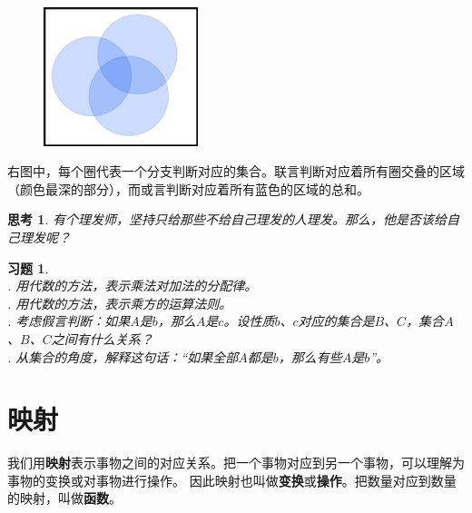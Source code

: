\documentclass[12pt,UTF8]{ctexbook}
\theoremstyle{definition}
\theoremstyle{plain}
\newtheorem{sk}{思考}[section]
\newtheorem{xt}{习题}[section]
\begin{document}
\begin{figure} %
    \vspace{-28pt}
    \flushright
    \includegraphics[width=0.4\textwidth]{tu/叠圈图1.png}
\end{figure}

右图中，每个圈代表一个分支判断对应的集合。联言判断对应着所有圈交叠的区域（颜色最深的部分），而或言判断对应着所有蓝色的区域的总和。

\begin{sk}\label{sk:2-1-1}
     有个理发师，坚持只给那些不给自己理发的人理发。那么，他是否该给自己理发呢？
\end{sk}

\begin{xt}\label{xt:2-1-1}
    \mbox{} \\
    . 用代数的方法，表示乘法对加法的分配律。\\
    . 用代数的方法，表示乘方的运算法则。\\
    . 考虑假言判断：如果$A$是$b$，那么$A$是$c$。设性质$b$、$c$对应的集合是$B$、$C$，集合$A$、$B$、$C$之间有什么关系？\\
    . 从集合的角度，解释这句话：“如果全部$A$都是$b$，那么有些$A$是$b$”。
\end{xt}

\section{映射}
我们用\textbf{映射}表示事物之间的对应关系。把一个事物对应到另一个事物，可以理解为事物的变换或对事物进行操作。
因此映射也叫做\textbf{变换}或\textbf{操作}。把数量对应到数量的映射，叫做\textbf{函数}。
\end{document}
